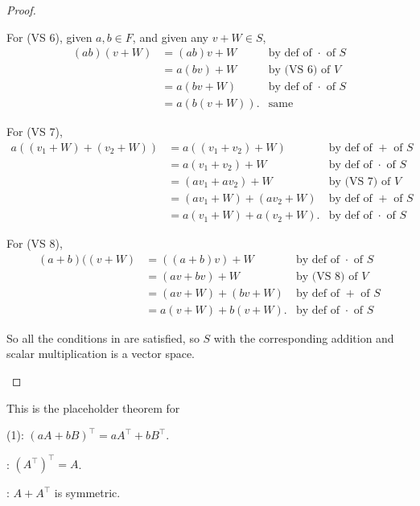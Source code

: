 \begin{proof}
\begin{enumerate}
For (VS 6), given \(a, b \in F\), and given any \(v + W \in S\),
\begin{align*}
    (ab)(v + W) & = (ab)v + W & \text{by def of \(\cdot\) of \(S\)} \\
                & = a(bv) + W & \text{by (VS 6) of \(V\)} \\
                & = a(bv + W) & \text{by def of \(\cdot\) of \(S\)} \\
                & = a(b(v + W)). & \text{same}
\end{align*}

For (VS 7),
\begin{align*}
    a((v_1 + W) + (v_2 + W)) & = a((v_1 + v_2) + W) & \text{by def of \(+\) of \(S\)} \\
                             & = a(v_1 + v_2) + W & \text{by def of \(\cdot\) of \(S\)} \\
                             & = (av_1 + av_2) + W & \text{by (VS 7) of \(V\)} \\
                             & = (av_1 + W) + (av_2 + W) & \text{by def of \(+\) of \(S\)} \\
                             & = a(v_1 + W) + a(v_2 + W). & \text{by def of \(\cdot\) of \(S\)}
\end{align*}

For (VS 8),
\begin{align*}
    (a + b)((v + W) & = ((a + b)v) + W & \text{by def of \(\cdot\) of \(S\)} \\
                             & = (av + bv) + W & \text{by (VS 8) of \(V\)} \\
                             & = (av + W) + (bv + W) & \text{by def of \(+\) of \(S\)} \\
                             & = a(v + W) + b(v + W). & \text{by def of \(\cdot\) of \(S\)}
\end{align*}

So all the conditions in  are satisfied, so \(S\) with the corresponding addition and scalar multiplication is a vector space.
\end{enumerate}
\end{proof}

\begin{additional theorem} \label{athm 1.2}
This is the placeholder theorem for

 (1): \((aA + bB)^\top = aA^\top + bB^\top\).

 : \((A^\top)^\top = A\).

 : \(A + A^\top\) is symmetric.
\end{additional theorem}

